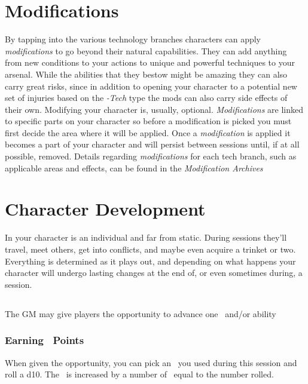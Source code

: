 \chapter{Modifications}\label{ch:biomods}
By tapping into the various technology branches characters can apply \emph{modifications} to go beyond their natural capabilities. They can add anything from new conditions to your actions to unique and powerful techniques to your arsenal. While the abilities that they bestow might be amazing they can also carry great risks, since in addition to opening your character to a potential new set of injuries based on the \emph{-Tech} type the mods can also carry side effects of their own.
Modifying your character is, usually, optional. \emph{Modifications} are linked to specific parts on your character so before a modification is picked you must first decide the area where it will be applied. Once a \emph{modification} is applied it becomes a part of your character and will persist between sessions until, if at all possible, removed.
Details regarding \emph{modifications} for each tech branch, such as applicable areas and effects, can be found in the \emph{Modification Archives}

\chapter{Character Development}\label{ch:char_develop}
In \gametitlemini your character is an individual and far from static. During sessions they'll travel, meet others, get into conflicts, and maybe even acquire a trinket or two. Everything is determined as it plays out, and depending on what happens your character will undergo lasting changes at the end of, or even sometimes during, a session.

\section{\advancement\index{\advancement}}\label{sec:advancement}
The GM may give players the opportunity to advance one \attribute\ and/or ability

\subsection{Earning \attribute\ Points}\label{subsec:adv_techniques}
When given the opportunity, you can pick an \attribute\ you used during this session and roll a d10. The \attribute\ is increased by a number of \attrval\ equal to the number rolled.

